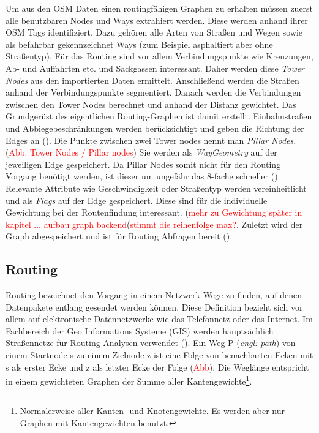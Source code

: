 \documentclass[10pt,a4paper]{article}
\newcommand\todo[1]{\textcolor{red}{#1}}
\begin{document}
Um aus den OSM Daten einen routingfähigen Graphen zu erhalten müssen zuerst alle benutzbaren Nodes und Ways extrahiert werden. Diese werden anhand ihrer OSM Tags identifiziert. Dazu gehören alle Arten von Straßen und Wegen sowie als befahrbar gekennzeichnet Ways (zum Beispiel asphaltiert aber ohne Straßentyp). Für das Routing sind vor allem Verbindungspunkte wie Kreuzungen, Ab- und Auffahrten etc. und Sackgassen interessant. Daher werden diese \textit{Tower Nodes} aus den importierten Daten ermittelt. Anschließend werden die Straßen anhand der Verbindungspunkte segmentiert. Danach werden die Verbindungen zwischen den Tower Nodes berechnet und anhand der Distanz gewichtet. Das Grundgerüst des eigentlichen Routing-Graphen ist damit erstellt. Einbahnstraßen und Abbiegebeschränkungen werden berücksichtigt und geben die Richtung der Edges an (\cite{osmgraph}). Die Punkte zwischen zwei Tower nodes nennt man \textit{Pillar Nodes}.(\todo{Abb. Tower Nodes / Pillar nodes}) Sie werden als \textit{WayGeometry} auf der jeweiligen Edge gespeichert. Da Pillar Nodes somit nicht für den Routing Vorgang benötigt werden, ist dieser um ungefähr das 8-fache schneller (\cite{graphhopper}). Relevante Attribute wie Geschwindigkeit oder Straßentyp werden vereinheitlicht und als \textit{Flags} auf der Edge gespeichert. Diese sind für die individuelle Gewichtung bei der Routenfindung interessant.  (\todo{mehr zu Gewichtung später in kapitel ... aufbau graph backend}(\todo{stimmt die reihenfolge max?}. Zuletzt wird der Graph abgespeichert und ist für Routing Abfragen bereit (\cite{osmgraph}). 

\subsection{Routing}

Routing bezeichnet den Vorgang in einem Netzwerk Wege zu finden, auf denen Datenpakete entlang gesendet werden können. Diese Definition bezieht sich vor allem auf elektronische Datennetzwerke wie das Telefonnetz oder das Internet. Im Fachbereich der Geo Informations Systeme (GIS) werden hauptsächlich Straßennetze für Routing Analysen verwendet (\cite[165]{handbook}). Ein Weg P (\textit{engl: path}) von einem Startnode s zu einem Zielnode z ist eine Folge von benachbarten Ecken mit s als erster Ecke und z als letzter Ecke der Folge (\todo{Abb}).
Die Weglänge entspricht in einem gewichteten Graphen der Summe aller Kantengewichte\footnote{Normalerweise aller Kanten- und Knotengewichte. Es werden aber nur Graphen mit Kantengewichten benutzt.}.
\end{document}
